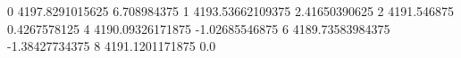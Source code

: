 0 4197.8291015625 6.708984375
1 4193.53662109375 2.41650390625
2 4191.546875 0.4267578125
4 4190.09326171875 -1.02685546875
6 4189.73583984375 -1.38427734375
8 4191.1201171875 0.0
